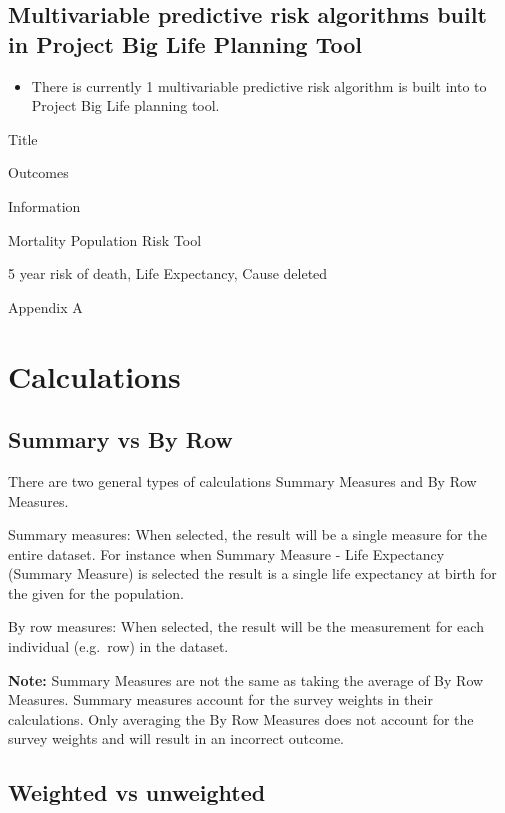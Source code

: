 \documentclass[]{book}
\providecommand{\tightlist}{%
  \setlength{\itemsep}{0pt}\setlength{\parskip}{0pt}}
\begin{document}
\subsection{Multivariable predictive risk algorithms built in Project
Big Life Planning
Tool}\label{multivariable-predictive-risk-algorithms-built-in-project-big-life-planning-tool}

\begin{itemize}
\tightlist
\item
  There is currently 1 multivariable predictive risk algorithm is built
  into to Project Big Life planning tool.
\end{itemize}

Title

Outcomes

Information

Mortality Population Risk Tool

5 year risk of death, Life Expectancy, Cause deleted

Appendix A

\section{Calculations}\label{calculations}

\subsection{Summary vs By Row}\label{summary-vs-by-row}

There are two general types of calculations Summary Measures and By Row
Measures.

Summary measures: When selected, the result will be a single measure for
the entire dataset. For instance when Summary Measure - Life Expectancy
(Summary Measure) is selected the result is a single life expectancy at
birth for the given for the population.

By row measures: When selected, the result will be the measurement for
each individual (e.g.~row) in the dataset.

\textbf{Note:} Summary Measures are not the same as taking the average
of By Row Measures. Summary measures account for the survey weights in
their calculations. Only averaging the By Row Measures does not account
for the survey weights and will result in an incorrect outcome.

\subsection{Weighted vs unweighted}\label{weighted-vs-unweighted}
\end{document}

